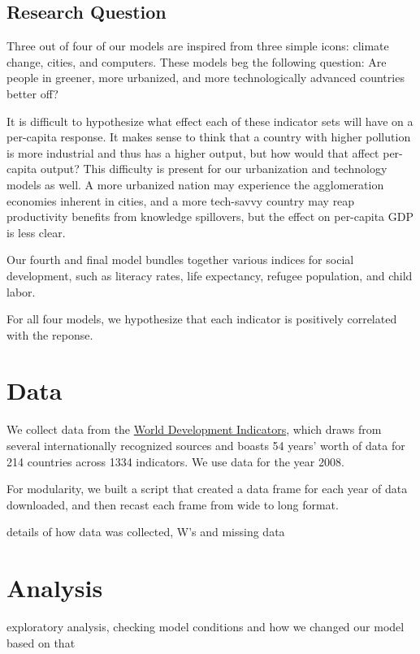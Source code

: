 \documentclass[DIV=calc, paper=a4, fontsize=12pt, twocolumn]{scrartcl} %
\begin{document}
\subsection{Research Question}
Three out of four of our models are inspired from three simple icons:
climate change, cities, and computers.
These models beg the following question:
Are people in greener, more urbanized, and more technologically advanced countries better off?

It is difficult to hypothesize what effect each of these indicator sets will have on a per-capita response.
It makes sense to think that a country with higher pollution is more industrial and thus has a higher output, 
but how would that affect per-capita output? This difficulty is present for our urbanization and technology models as well.
A more urbanized nation may experience the agglomeration economies inherent in cities, and a more
tech-savvy country may reap productivity benefits from knowledge spillovers, but the effect on per-capita GDP is less clear.

Our fourth and final model bundles together various indices for social development,
such as literacy rates, life expectancy, refugee population, and child labor.

For all four models, we hypothesize that each indicator is positively correlated with the reponse.




\section{Data}
We collect data from the \href{http://data.worldbank.org/indicator}{World Development Indicators}, 
which draws from several internationally recognized sources and boasts 54 years' worth of data for 214 countries across 1334 indicators.
We use data for the year 2008.

For modularity, we built a script that created a data frame for each year of data downloaded, and then recast each frame from wide to long format.

details of how data was collected, W's and missing data




\section{Analysis}
exploratory analysis, checking model conditions and how we changed our model based on that
\end{document}
